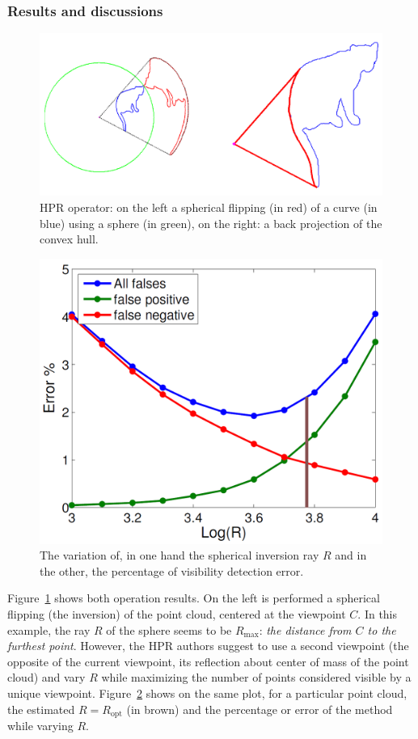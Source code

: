 \subsubsection{Results and discussions}
\begin{figure}[h]
  \centering
  \includegraphics[scale=0.2]{img/hpr.png}
  \caption{HPR operator: on the left a spherical flipping (in red) of a curve (in blue) using a sphere (in green), on the right: a back projection of the convex hull.}
  \label{fig:hpr}
\end{figure}
\begin{figure}[h]
  \centering
  \includegraphics[scale=0.35]{img/hpr-r.png}
  \caption{The variation of, in one hand the spherical inversion ray $R$ and in the other, the percentage of visibility detection error.}
  \label{fig:hpr-r}
\end{figure}
Figure~\ref{fig:hpr} shows both operation results. On the left is performed a spherical flipping (the inversion) of the point cloud, centered at the viewpoint $C$. In this example, the ray $R$ of the sphere seems to be $R_\text{max}$: \emph{the distance from $C$ to the furthest point}. However, the HPR authors suggest to use a second viewpoint (the opposite of the current viewpoint, its reflection about center of mass of the point cloud) and vary $R$ while maximizing the number of points considered visible by a unique viewpoint. Figure~\ref{fig:hpr-r} shows on the same plot, for a particular point cloud, the estimated $R=R_\text{opt}$ (in brown) and the percentage or error of the method while varying $R$.\\

